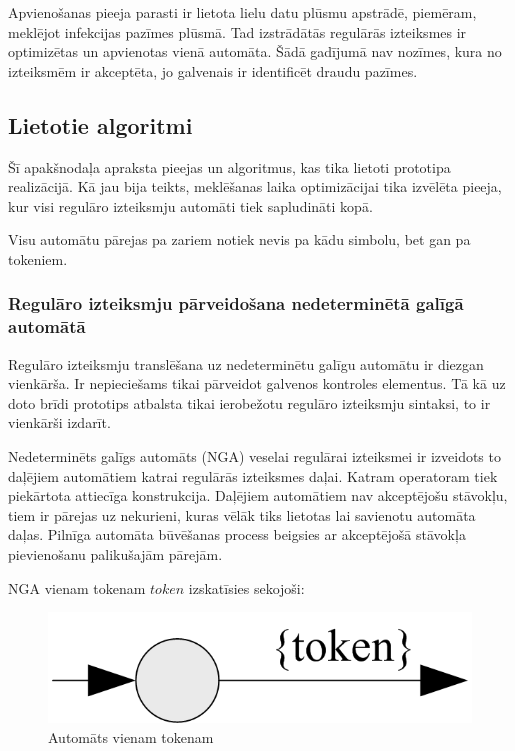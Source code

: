 Apvienošanas pieeja parasti ir lietota lielu datu plūsmu apstrādē, piemēram, meklējot infekcijas pazīmes plūsmā. Tad izstrādātās regulārās izteiksmes ir optimizētas un apvienotas vienā automāta. Šādā gadījumā nav nozīmes, kura no izteiksmēm ir akceptēta, jo galvenais ir identificēt draudu pazīmes. 

\subsection{\label{subsec:solution_algorithms}Lietotie algoritmi}

Šī apakšnodaļa apraksta pieejas un algoritmus, kas tika lietoti prototipa realizācijā. Kā jau bija teikts, meklēšanas laika optimizācijai tika izvēlēta pieeja, kur visi regulāro izteiksmju automāti tiek sapludināti kopā.

Visu automātu pārejas pa zariem notiek nevis pa kādu simbolu, bet gan pa tokeniem.

\subsubsection{Regulāro izteiksmju pārveidošana nedeterminētā galīgā automātā}

Regulāro izteiksmju translēšana uz nedeterminētu galīgu automātu ir diezgan vienkārša. Ir nepieciešams tikai pārveidot galvenos kontroles elementus. Tā kā uz doto brīdi prototips atbalsta tikai ierobežotu regulāro izteiksmju sintaksi, to ir vienkārši izdarīt.

Nedeterminēts galīgs automāts (NGA) veselai regulārai izteiksmei ir izveidots to daļējiem automātiem katrai regulārās izteiksmes daļai. Katram operatoram tiek piekārtota attiecīga konstrukcija. Daļējiem automātiem nav akceptējošu stāvokļu, tiem ir pārejas uz nekurieni, kuras vēlāk tiks lietotas lai savienotu automāta daļas. Pilnīga automāta būvēšanas process beigsies ar akceptējošā stāvokļa pievienošanu palikušajām pārejām.

NGA vienam tokenam ${token}$ izskatīsies sekojoši:
\begin{figure}[h]
  \centering
    \includegraphics[scale=1.5]{pictures/auto_token_1}
  \caption{\label{fig:auto_token}Automāts vienam tokenam}
\end{figure}

